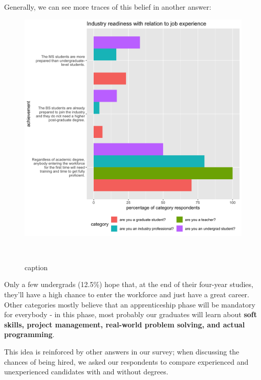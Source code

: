 \documentclass{sigchi}
\begin{document}
Generally, we can see more traces of this belief in another answer:

\begin{figure}
\includegraphics[scale=0.2]{../data-analysis/plots_output/Industry_readiness_with_relation_to_job_experience.png}
 \caption{caption}~\label{fig:figure5}
\end{figure}

Only a few undergrads (12.5\%) hope that, at the end of their four-year studies, they'll have a high chance to enter the workforce and just have a great career. Other categories mostly believe that an apprenticeship phase will be mandatory for everybody - in this phase, most probably our graduates will learn about \textbf{soft skills, project management, real-world problem solving, and actual programming}.

This idea is reinforced by other answers in our survey; when discussing the chances of being hired, we asked our respondents to compare experienced and unexperienced candidates with and without degrees.
\end{document}
